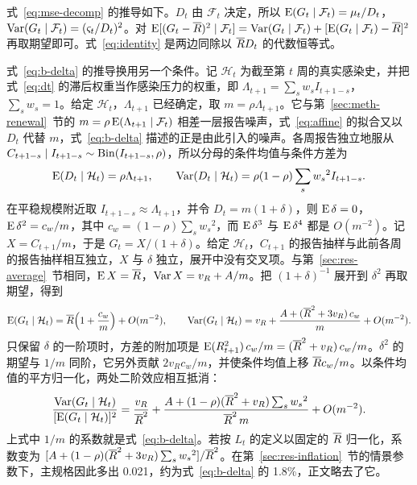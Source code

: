 式~\eqref{eq:mse-decomp} 的推导如下。$D_t$ 由 $\mathcal F_t$ 决定，所以 $\operatorname{E}(G_t\mid\mathcal F_t)=\mu_t/D_t$，$\operatorname{Var}(G_t\mid\mathcal F_t)=(\varsigma_t/D_t)^2$。对 $\operatorname{E}[(G_t-\overline{R})^2\mid\mathcal F_t]=\operatorname{Var}(G_t\mid\mathcal F_t)+[\operatorname{E}(G_t\mid\mathcal F_t)-\overline{R}]^2$ 再取期望即可。式~\eqref{eq:identity} 是两边同除以 $\overline{R} D_t$ 的代数恒等式。

式~\eqref{eq:b-delta} 的推导换用另一个条件。记 $\mathcal H_t$ 为截至第 $t$ 周的真实感染史，并把式~\eqref{eq:dt} 的滞后权重当作感染压力的权重，即 $\Lambda_{t+1}=\sum_s w_sI_{t+1-s}$，$\sum_s w_s=1$。给定 $\mathcal H_t$，$\Lambda_{t+1}$ 已经确定，取 $m=\rho\Lambda_{t+1}$。它与第~\ref{sec:meth-renewal}~节的 $m=\rho\operatorname{E}(\Lambda_{t+1}\mid\mathcal F_t)$ 相差一层报告噪声，式~\eqref{eq:affine} 的拟合又以 $D_t$ 代替 $m$，式~\eqref{eq:b-delta} 描述的正是由此引入的噪声。各周报告独立地服从 $C_{t+1-s}\mid I_{t+1-s}\sim\operatorname{Bin}(I_{t+1-s},\rho)$，所以分母的条件均值与条件方差为
\begin{equation}
  \operatorname{E}(D_t\mid\mathcal H_t)=\rho\Lambda_{t+1},\qquad
  \operatorname{Var}(D_t\mid\mathcal H_t)=\rho(1-\rho)\sum_s {w_s}^2I_{t+1-s}.
\end{equation}
在平稳规模附近取 $I_{t+1-s}\approx\Lambda_{t+1}$，并令 $D_t=m(1+\delta)$，则 $\operatorname{E}\delta=0$，$\operatorname{E}\delta^2=c_w/m$，其中 $c_w=(1-\rho)\sum_s {w_s}^2$，而 $\operatorname{E}\delta^3$ 与 $\operatorname{E}\delta^4$ 都是 $O(m^{-2})$。记 $X=C_{t+1}/m$，于是 $G_t=X/(1+\delta)$。给定 $\mathcal H_t$，$C_{t+1}$ 的报告抽样与此前各周的报告抽样相互独立，$X$ 与 $\delta$ 独立，展开中没有交叉项。与第~\ref{sec:res-average}~节相同，$\operatorname{E} X=\overline{R}$，$\operatorname{Var} X=v_R+A/m$。把 $(1+\delta)^{-1}$ 展开到 $\delta^2$ 再取期望，得到
\begin{equation}
  \operatorname{E}(G_t\mid\mathcal H_t)=\overline{R}\Bigl(1+\frac{c_w}{m}\Bigr)+O(m^{-2}),\qquad
  \operatorname{Var}(G_t\mid\mathcal H_t)=v_R+\frac{A+(\overline{R}^2+3v_R)\,c_w}{m}+O(m^{-2}).
\end{equation}
只保留 $\delta$ 的一阶项时，方差的附加项是 $\operatorname{E}(R_{t+1}^2)\,c_w/m=(\overline{R}^2+v_R)\,c_w/m$。$\delta^2$ 的期望与 $1/m$ 同阶，它另外贡献 $2v_Rc_w/m$，并使条件均值上移 $\overline{R} c_w/m$。以条件均值的平方归一化，两处二阶效应相互抵消：
\begin{equation}
  \frac{\operatorname{Var}(G_t\mid\mathcal H_t)}{[\operatorname{E}(G_t\mid\mathcal H_t)]^2}
  =\frac{v_R}{\overline{R}^2}+\frac{A+(1-\rho)(\overline{R}^2+v_R)\sum_s {w_s}^2}{\overline{R}^2\,m}+O(m^{-2}).
\end{equation}
上式中 $1/m$ 的系数就是式~\eqref{eq:b-delta}。若按 $L_t$ 的定义以固定的 $\overline{R}$ 归一化，系数变为 $[A+(1-\rho)(\overline{R}^2+3v_R)\sum_s {w_s}^2]/\overline{R}^2$。在第~\ref{sec:res-inflation}~节的情景参数下，主规格因此多出 0.021，约为式~\eqref{eq:b-delta} 的 1.8\%，正文略去了它。

